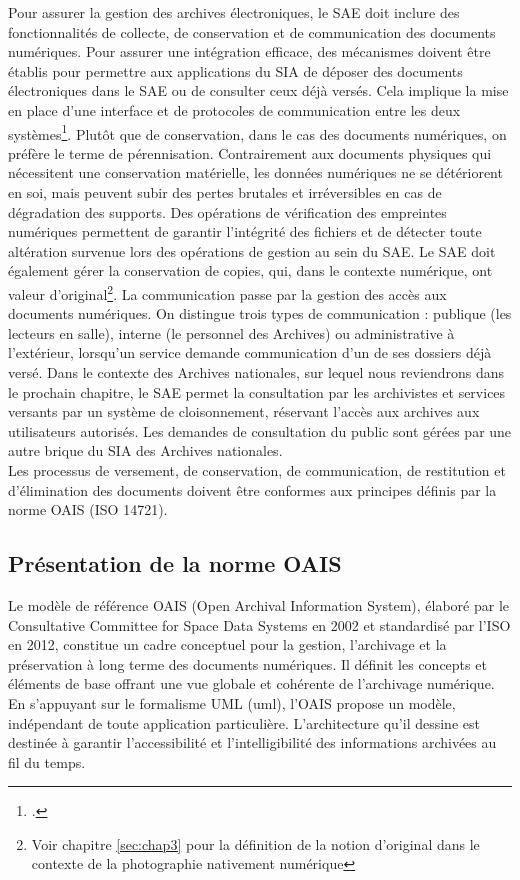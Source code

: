 Pour assurer la gestion des archives électroniques, le SAE doit inclure des fonctionnalités de collecte, de conservation et de communication des documents numériques. Pour assurer une intégration efficace, des mécanismes doivent être établis pour permettre aux applications du SIA de déposer des documents électroniques dans le SAE ou de consulter ceux déjà versés. Cela implique la mise en place d'une interface et de protocoles de communication entre les deux systèmes\footcite{wakimSAESystemesStockage2011}. Plutôt que de conservation, dans le cas des documents numériques, on préfère le terme de pérennisation. Contrairement aux documents physiques qui nécessitent une conservation matérielle, les données numériques ne se détériorent en soi, mais peuvent subir des pertes brutales et irréversibles en cas de dégradation des supports. Des opérations de vérification des empreintes numériques permettent de garantir l'intégrité des fichiers et de détecter toute altération survenue lors des opérations de gestion au sein du SAE. Le SAE doit également gérer la conservation de copies, qui, dans le contexte numérique, ont valeur d'original\footnote{Voir chapitre \ref{sec:chap3} pour la définition de la notion d'original dans le contexte de la photographie nativement numérique}. La communication passe par la gestion des accès aux documents numériques. On distingue trois types de communication : publique (les lecteurs en salle), interne (le personnel des Archives) ou administrative à l’extérieur, lorsqu’un service demande communication d’un de ses dossiers déjà versé. Dans le contexte des Archives nationales, sur lequel nous reviendrons dans le prochain chapitre, le SAE permet la consultation par les archivistes et services versants par un système de cloisonnement, réservant l'accès aux archives aux utilisateurs autorisés. Les demandes de consultation du public sont gérées par une autre brique du SIA des Archives nationales.
\\

Les processus de versement, de conservation, de communication, de restitution et d’élimination des documents doivent être conformes aux principes définis par la norme OAIS (ISO 14721).

\subsection*{Présentation de la norme OAIS}

Le modèle de référence OAIS (Open Archival Information System), élaboré par le Consultative Committee for Space Data Systems en 2002 et standardisé par l'ISO en 2012, constitue un cadre conceptuel pour la gestion, l'archivage et la préservation à long terme des documents numériques. Il définit les concepts et éléments de base offrant une vue globale et cohérente de l'archivage numérique. En s'appuyant sur le formalisme UML (\gls{uml}), l'OAIS propose un modèle, indépendant de toute application particulière. L'architecture qu'il dessine est destinée à garantir l'accessibilité et l'intelligibilité des informations archivées au fil du temps.

